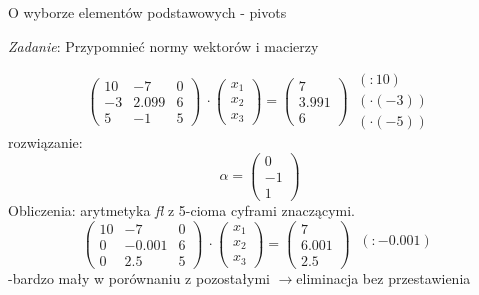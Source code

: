 \begin{frame}{ O wyborze elementów podstawowych - pivots}
\begin{flushright}
{\it Zadanie}: Przypomnieć normy wektorów $\mathrm{i}$ macierzy
\end{flushright}
$$
\left(\begin{array}{lll}
10 & -7 & 0\\
-3 & 2.099 & 6\\
5 & -1 & 5
\end{array}\right)\ \cdot
\left(\begin{array}{l}
x_{1}\\
x_{2}\\
x_{3}
\end{array}\right)=\left(\begin{array}{l}
7\\
3.991\\
6
\end{array}\right)\ 
\begin{array}{l}
(:10)\\
(\cdot(-3))\\
(\cdot(-5))
\end{array}
$$
rozwiązanie:
$$
\alpha=\left(\begin{array}{l}
0\\
-1\\
1
\end{array}\right)
$$
Obliczenia: arytmetyka {\it fl} z 5-cioma cyframi znaczącymi.
$$
\left(\begin{array}{lll}
10 & -7 & 0\\
0 & -0.001 & 6\\
0 & 2.5 & 5
\end{array}\right)\ \cdot
\left(\begin{array}{l}
x_{1}\\
x_{2}\\
x_{3}
\end{array}\right)=\left(\begin{array}{l}
7\\
6.001\\
2.5
\end{array}\right)\ 
\begin{array}{l}
\\
(:-0.001)
\\
\\
\end{array}
$$
 -bardzo mały w porównaniu z pozostałymi $\rightarrow$eliminacja bez przestawienia

\end{frame}
